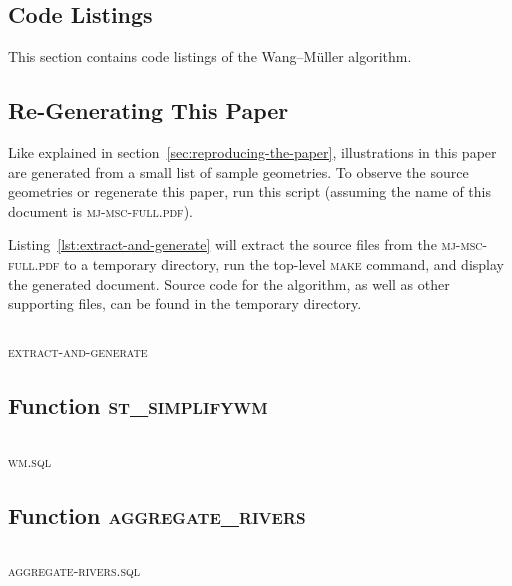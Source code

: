 \documentclass[a4paper]{article}
\newcommand{\WM}{Wang--M{\"u}ller}
\newcommand{\inputcode}[2]{\inputminted[fontsize=\small]{#1}{#2}}
\newenvironment{longlisting}{\captionsetup{type=listing}}{}
\begin{document}
\begin{appendices}

\section{Code Listings}

This section contains code listings of the {\WM} algorithm.

\subsection{Re-Generating This Paper}
\label{sec:code-regenerate}

Like explained in section~\ref{sec:reproducing-the-paper}, illustrations in
    this paper are generated from a small list of sample geometries. To observe
    the source geometries or regenerate this paper, run this script (assuming
    the name of this document is \textsc{mj-msc-full.pdf}).

    Listing~\ref{lst:extract-and-generate} will extract the source files from
    the \textsc{mj-msc-full.pdf} to a temporary directory, run the top-level
    \textsc{make} command, and display the generated document. Source code for
    the algorithm, as well as other supporting files, can be found in the
    temporary directory.

\begin{longlisting}
    \inputcode{bash}{extract-and-generate}
    \caption{\textsc{extract-and-generate}}
    \label{lst:extract-and-generate}
\end{longlisting}

\subsection{Function \textsc{st\_simplifywm}}
\begin{longlisting}
    \inputcode{postgresql}{wm.sql}
    \caption{\textsc{wm.sql}}
    \label{lst:wm.sql}
\end{longlisting}

\subsection{Function \textsc{aggregate\_rivers}}
\begin{longlisting}
    \inputcode{postgresql}{aggregate-rivers.sql}
    \caption{\textsc{aggregate-rivers.sql}}
    \label{lst:aggregate-rivers.sql}
\end{longlisting}

\end{appendices}
\end{document}
